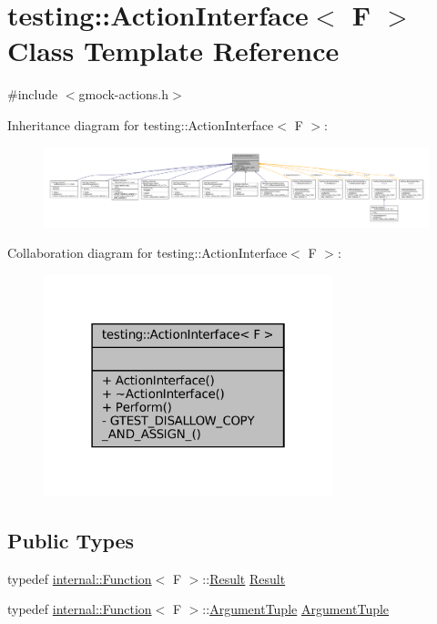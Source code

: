 \hypertarget{classtesting_1_1ActionInterface}{}\section{testing\+:\+:Action\+Interface$<$ F $>$ Class Template Reference}
\label{classtesting_1_1ActionInterface}


{\ttfamily \#include $<$gmock-\/actions.\+h$>$}



Inheritance diagram for testing\+:\+:Action\+Interface$<$ F $>$\+:
\nopagebreak
\begin{figure}[H]
\begin{center}
\leavevmode
\includegraphics[width=350pt]{classtesting_1_1ActionInterface__inherit__graph}
\end{center}
\end{figure}


Collaboration diagram for testing\+:\+:Action\+Interface$<$ F $>$\+:
\nopagebreak
\begin{figure}[H]
\begin{center}
\leavevmode
\includegraphics[width=238pt]{classtesting_1_1ActionInterface__coll__graph}
\end{center}
\end{figure}
\subsection*{Public Types}
\begin{DoxyCompactItemize}
\item 
typedef \hyperlink{structtesting_1_1internal_1_1Function}{internal\+::\+Function}$<$ F $>$\+::\hyperlink{classtesting_1_1ActionInterface_a7477de2fe3e4e01c59db698203acaee7}{Result} \hyperlink{classtesting_1_1ActionInterface_a7477de2fe3e4e01c59db698203acaee7}{Result}
\item 
typedef \hyperlink{structtesting_1_1internal_1_1Function}{internal\+::\+Function}$<$ F $>$\+::\hyperlink{classtesting_1_1ActionInterface_af72720d864da4d606629e83edc003511}{Argument\+Tuple} \hyperlink{classtesting_1_1ActionInterface_af72720d864da4d606629e83edc003511}{Argument\+Tuple}
\end{DoxyCompactItemize}

